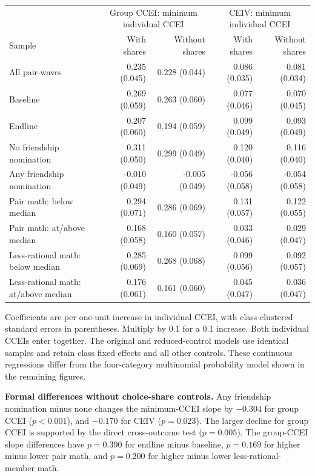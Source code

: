 \documentclass[11pt]{article}
\begin{document}
\begin{center}\small\begin{tabular}{lrrrr}\toprule
& \multicolumn{2}{c}{Group CCEI: minimum individual CCEI} & \multicolumn{2}{c}{CEIV: minimum individual CCEI}\\
Sample & With shares & Without shares & With shares & Without shares\\\midrule
All pair-waves & 0.235 (0.045) & 0.228 (0.044) & 0.086 (0.035) & 0.081 (0.034)\\
Baseline & 0.269 (0.059) & 0.263 (0.060) & 0.077 (0.046) & 0.070 (0.045)\\
Endline & 0.207 (0.060) & 0.194 (0.059) & 0.099 (0.049) & 0.093 (0.049)\\
No friendship nomination & 0.311 (0.050) & 0.299 (0.049) & 0.120 (0.040) & 0.116 (0.040)\\
Any friendship nomination & -0.010 (0.049) & -0.005 (0.049) & -0.056 (0.058) & -0.054 (0.058)\\
Pair math: below median & 0.294 (0.071) & 0.286 (0.069) & 0.131 (0.057) & 0.122 (0.055)\\
Pair math: at/above median & 0.168 (0.058) & 0.160 (0.057) & 0.033 (0.046) & 0.029 (0.047)\\
Less-rational math: below median & 0.285 (0.069) & 0.268 (0.068) & 0.099 (0.056) & 0.092 (0.057)\\
Less-rational math: at/above median & 0.176 (0.061) & 0.161 (0.060) & 0.045 (0.047) & 0.036 (0.047)\\
\bottomrule\end{tabular}\end{center}
\small
Coefficients are per one-unit increase in individual CCEI, with class-clustered standard errors in parentheses.
Multiply by 0.1 for a 0.1 increase. Both individual CCEIs enter together. The original and reduced-control models
use identical samples and retain class fixed effects and all other controls. These continuous regressions differ
from the four-category multinomial probability model shown in the remaining figures.

\textbf{Formal differences without choice-share controls.} Any friendship nomination minus none changes the
minimum-CCEI slope by $-0.304$ for group CCEI ($p<0.001$), and $-0.170$ for CEIV ($p=0.023$).
The larger decline for group CCEI is supported by the direct cross-outcome test ($p=0.005$).
The group-CCEI slope differences have $p=0.390$ for endline minus baseline, $p=0.169$ for higher minus lower
pair math, and $p=0.200$ for higher minus lower less-rational-member math.
\end{document}
